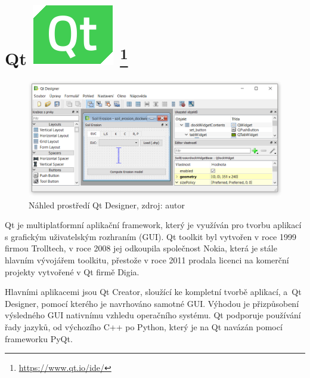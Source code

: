 \section[Qt]{Qt \includegraphics[scale=0.20]{./pictures/qt.png} 
\footnote{\url{https://www.qt.io/ide/}}}
\label{qt}
\begin{figure}[H]
    \centering \includegraphics[scale=0.6]{./pictures/qt_screen.png}
      \caption[Náhled prostředí Qt Designer]
      {Náhled prostředí Qt Designer, zdroj: autor}
      \label{screen:qt}
\end{figure}
Qt je multiplatformní aplikační framework, který je využíván pro
tvorbu aplikací s grafickým uživatelským rozhraním (GUI). Qt toolkit
byl vytvořen v roce 1999 firmou Trolltech, v roce 2008 jej odkoupila
společnost Nokia, která je stále hlavním vývojářem toolkitu, přestože
v roce 2011 prodala licenci na komerční projekty vytvořené v Qt firmě
Digia.

Hlavními aplikacemi jsou Qt Creator, sloužící ke kompletní tvorbě
aplikací, a~Qt Designer, pomocí kterého je navrhováno samotné
GUI. Výhodou je přizpůsobení výsledného GUI nativnímu vzhledu
operačního systému. Qt podporuje používání řady jazyků, od výchozího
C++ po Python, který je na Qt navázán pomocí frameworku PyQt.\cite{qt}
\cite{rapidPyQt}
